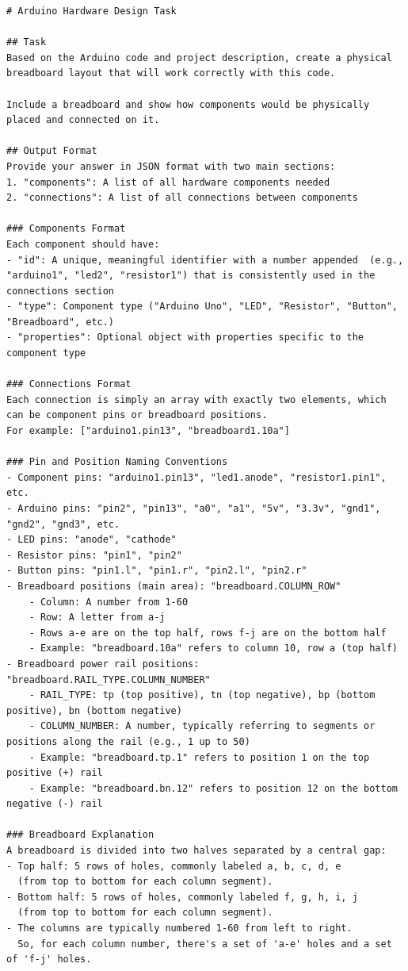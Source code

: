\documentclass{article} %
\newlength{\promptboxmargin}
\begin{document}
\begin{adjustwidth}{\promptboxmargin}{\promptboxmargin}
\begin{lstlisting}[style=promptstyle, caption={Circuit Generation Task (Physical)}, basicstyle=\ttfamily\footnotesize]
# Arduino Hardware Design Task

## Task
Based on the Arduino code and project description, create a physical breadboard layout that will work correctly with this code.

Include a breadboard and show how components would be physically placed and connected on it.

## Output Format
Provide your answer in JSON format with two main sections:
1. "components": A list of all hardware components needed
2. "connections": A list of all connections between components

### Components Format
Each component should have:
- "id": A unique, meaningful identifier with a number appended  (e.g., "arduino1", "led2", "resistor1") that is consistently used in the connections section
- "type": Component type ("Arduino Uno", "LED", "Resistor", "Button", "Breadboard", etc.)
- "properties": Optional object with properties specific to the component type

### Connections Format
Each connection is simply an array with exactly two elements, which can be component pins or breadboard positions.
For example: ["arduino1.pin13", "breadboard1.10a"]

### Pin and Position Naming Conventions
- Component pins: "arduino1.pin13", "led1.anode", "resistor1.pin1", etc.
- Arduino pins: "pin2", "pin13", "a0", "a1", "5v", "3.3v", "gnd1", "gnd2", "gnd3", etc.
- LED pins: "anode", "cathode"
- Resistor pins: "pin1", "pin2"
- Button pins: "pin1.l", "pin1.r", "pin2.l", "pin2.r"
- Breadboard positions (main area): "breadboard.COLUMN_ROW"
    - Column: A number from 1-60
    - Row: A letter from a-j
    - Rows a-e are on the top half, rows f-j are on the bottom half
    - Example: "breadboard.10a" refers to column 10, row a (top half)
- Breadboard power rail positions: "breadboard.RAIL_TYPE.COLUMN_NUMBER"
    - RAIL_TYPE: tp (top positive), tn (top negative), bp (bottom positive), bn (bottom negative)
    - COLUMN_NUMBER: A number, typically referring to segments or positions along the rail (e.g., 1 up to 50)
    - Example: "breadboard.tp.1" refers to position 1 on the top positive (+) rail
    - Example: "breadboard.bn.12" refers to position 12 on the bottom negative (-) rail

### Breadboard Explanation
A breadboard is divided into two halves separated by a central gap:
- Top half: 5 rows of holes, commonly labeled a, b, c, d, e
  (from top to bottom for each column segment).
- Bottom half: 5 rows of holes, commonly labeled f, g, h, i, j
  (from top to bottom for each column segment).
- The columns are typically numbered 1-60 from left to right.
  So, for each column number, there's a set of 'a-e' holes and a set of 'f-j' holes.


\end{lstlisting}
\end{adjustwidth}
\end{document}
